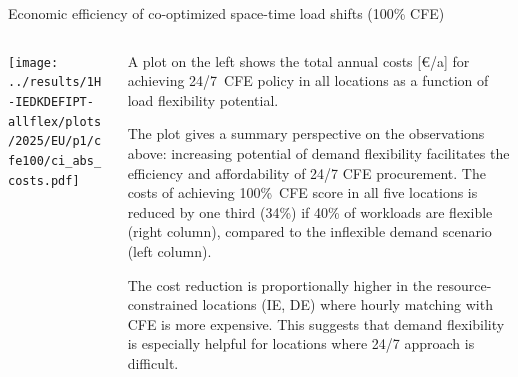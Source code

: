\begin{frame}{Economic efficiency of co-optimized space-time load shifts (100\% CFE)}
\label{sec:efficiency}

  {\footnotesize
  \vspace{0.2cm}
  
  \begin{columns}
  \begin{column}{8cm}
  \centering
  \vspace{0.2cm}
  \texttt{[image: ../results/1H-IEDKDEFIPT-allflex/plots/2025/EU/p1/cfe100/ci\_abs\_costs.pdf]}
  \end{column}
  
  \begin{column}{7cm}
    A plot on the left shows the \alert{total annual costs [\euro/a]} for achieving 24/7~CFE policy in all locations as a function of load flexibility potential. 
    
    \vspace{0.1cm} 
    The plot gives a summary perspective on the observations above: increasing potential of demand flexibility facilitates the \alert{efficiency and affordability} of 24/7 CFE procurement. The costs of achieving 100\%~CFE score in all five locations is reduced by one third (34\%) if 40\% of workloads are flexible (right column), compared to the inflexible demand scenario (left column).

    \vspace{0.1cm} 
    The cost reduction is proportionally higher in the resource-constrained locations (IE, DE) where hourly matching with CFE is more expensive. This suggests that demand flexibility is especially helpful for locations \alert{where 24/7 approach is difficult}.

    \end{column}
  \end{columns}
  
  }
\end{frame}


